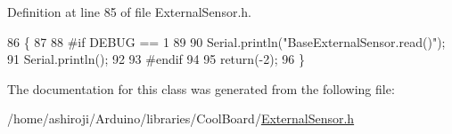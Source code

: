 Definition at line 85 of file External\+Sensor.\+h.


\begin{DoxyCode}
86     \{
87     
88 \textcolor{preprocessor}{    #if DEBUG == 1 }
89 
90         Serial.println(\textcolor{stringliteral}{"BaseExternalSensor.read()"});
91         Serial.println();
92     
93 \textcolor{preprocessor}{    #endif      }
94         
95         \textcolor{keywordflow}{return}(-2);
96     \}
\end{DoxyCode}


The documentation for this class was generated from the following file\+:\begin{DoxyCompactItemize}
\item 
/home/ashiroji/\+Arduino/libraries/\+Cool\+Board/\hyperlink{ExternalSensor_8h}{External\+Sensor.\+h}\end{DoxyCompactItemize}
